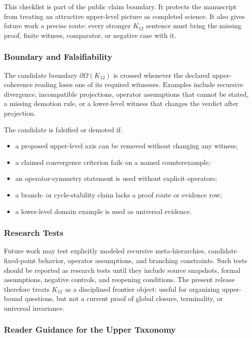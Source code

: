 This checklist is part of the public claim boundary. It protects the manuscript
from treating an attractive upper-level picture as completed science. It also
gives future work a precise route: every stronger \(K_{12}\) sentence must
bring the missing proof, finite witness, comparator, or negative case with it.

\subsubsection{Boundary and Falsifiability}

The candidate boundary \(\partial\Omega(K_{12})\) is crossed whenever the
declared upper-coherence reading loses one of its required witnesses. Examples
include recursive divergence, incompatible projections, operator assumptions
that cannot be stated, a missing demotion rule, or a lower-level witness that
changes the verdict after projection.

The candidate is falsified or demoted if:
\begin{itemize}
\item a proposed upper-level axis can be removed without changing any witness;
\item a claimed convergence criterion fails on a named counterexample;
\item an operator-symmetry statement is used without explicit operators;
\item a branch- or cycle-stability claim lacks a proof route or evidence row;
\item a lower-level domain example is used as universal evidence.
\end{itemize}

\subsubsection{Research Tests}

Future work may test explicitly modeled recursive meta-hierarchies, candidate
fixed-point behavior, operator assumptions, and branching constraints. Such
tests should be reported as research tests until they include source snapshots,
formal assumptions, negative controls, and reopening conditions. The present
release therefore treats \(K_{12}\) as a disciplined frontier object: useful
for organizing upper-bound questions, but not a current proof of global
closure, terminality, or universal invariance.

\subsubsection{Reader Guidance for the Upper Taxonomy}

